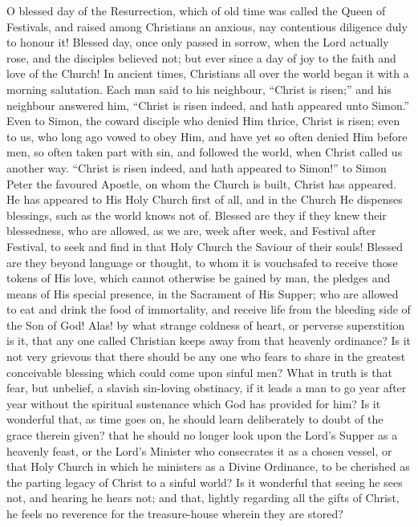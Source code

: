 O blessed day of the Resurrection, which of old time was called the
Queen of Festivals, and raised among Christians an anxious, nay
contentious diligence duly to honour it! Blessed day, once only passed
in sorrow, when the Lord actually rose, and the disciples believed not;
but ever since a day of joy to the faith and love of the Church! In
ancient times, Christians all over the world began it with a morning
salutation. Each man said to his neighbour, ``Christ is risen;''
and his neighbour answered him, ``Christ is risen indeed, and hath
appeared unto Simon.'' Even to Simon, the coward disciple who denied
Him thrice, Christ is risen; even to us, who long ago vowed to obey Him,
and have yet so often denied Him before men, so often taken part with
sin, and followed the world, when Christ called us another way.
``Christ is risen indeed, and hath appeared to Simon!'' to Simon
Peter the favoured Apostle, on whom the Church is built, Christ has
appeared. He has appeared to His Holy Church first of all, and in the
Church He dispenses blessings, such as the world knows not of. Blessed
are they if they knew their blessedness, who are allowed, as we are,
week after week, and Festival after Festival, to seek and find in that
Holy Church the Saviour of their souls! Blessed are they beyond language
or thought, to whom it is vouchsafed to receive those tokens of His
love, which cannot otherwise be gained by man, the pledges and means of
His special presence, in the Sacrament of His Supper; who are allowed to
eat and drink the food of immortality, and receive life from the
bleeding side of the Son of God! Alas! by what strange coldness of
heart, or perverse superstition is it, that any one called Christian
keeps away from that heavenly ordinance? Is it not very grievous that
there should be any one who fears to share in the greatest conceivable
blessing which could come upon sinful men? What in truth is that fear,
but unbelief, a slavish sin-loving obstinacy, if it leads a man to go
year after year without the spiritual sustenance which God has provided
for him? Is it wonderful that, as time goes on, he should learn
deliberately to doubt of the grace therein given? that he should no
longer look upon the Lord's Supper as a heavenly feast, or the Lord's
Minister who consecrates it as a chosen vessel, or that Holy Church in
which he ministers as a Divine Ordinance, to be cherished as the parting
legacy of Christ to a sinful world? Is it wonderful that seeing he sees
not, and hearing he hears not; and that, lightly regarding all the gifts
of Christ, he feels no reverence for the treasure-house wherein they are
stored?

